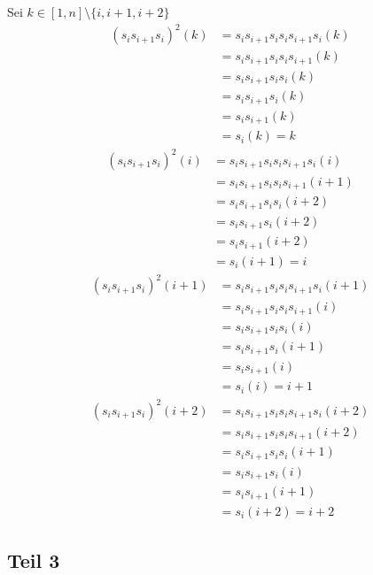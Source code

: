 \documentclass[10pt,a4paper]{article}
\begin{document}
Sei $k \in [1, n] \setminus \{i, i + 1, i + 2\}$
\begin{align*}
(s_{i}s_{i + 1}s_{i})^{2}(k) & = s_{i}s_{i + 1}s_{i}s_{i}s_{i + 1}s_{i}(k)\\
& = s_{i}s_{i + 1}s_{i}s_{i}s_{i + 1}(k)\\
& = s_{i}s_{i + 1}s_{i}s_{i}(k)\\
& = s_{i}s_{i + 1}s_{i}(k)\\
& = s_{i}s_{i + 1}(k)\\
& = s_{i}(k) = k
\end{align*}
\begin{align*}
(s_{i}s_{i + 1}s_{i})^{2}(i) & = s_{i}s_{i + 1}s_{i}s_{i}s_{i + 1}s_{i}(i)\\
& = s_{i}s_{i + 1}s_{i}s_{i}s_{i + 1}(i + 1)\\
& = s_{i}s_{i + 1}s_{i}s_{i}(i + 2)\\
& = s_{i}s_{i + 1}s_{i}(i + 2)\\
& = s_{i}s_{i + 1}(i + 2)\\
& = s_{i}(i + 1) = i
\end{align*}
\begin{align*}
(s_{i}s_{i + 1}s_{i})^{2}(i + 1) & = s_{i}s_{i + 1}s_{i}s_{i}s_{i + 1}s_{i}(i + 1)\\
& = s_{i}s_{i + 1}s_{i}s_{i}s_{i + 1}(i)\\
& = s_{i}s_{i + 1}s_{i}s_{i}(i)\\
& = s_{i}s_{i + 1}s_{i}(i + 1)\\
& = s_{i}s_{i + 1}(i)\\
& = s_{i}(i) = i + 1
\end{align*}
\begin{align*}
(s_{i}s_{i + 1}s_{i})^{2}(i + 2) & = s_{i}s_{i + 1}s_{i}s_{i}s_{i + 1}s_{i}(i + 2)\\
& = s_{i}s_{i + 1}s_{i}s_{i}s_{i + 1}(i + 2)\\
& = s_{i}s_{i + 1}s_{i}s_{i}(i + 1)\\
& = s_{i}s_{i + 1}s_{i}(i)\\
& = s_{i}s_{i + 1}(i + 1)\\
& = s_{i}(i + 2) = i + 2
\end{align*}

\subsection*{Teil 3}
\end{document}

